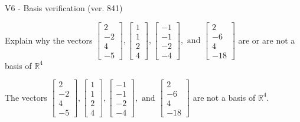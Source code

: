 \begin{exercise}
  \begin{exerciseTitle}V6 - Basis verification (ver. 841)\end{exerciseTitle}
  \begin{exerciseStatement}
    Explain why the vectors \(\left[\begin{array}{r}
2 \\
-2 \\
4 \\
-5
\end{array}\right] , \left[\begin{array}{r}
1 \\
1 \\
2 \\
4
\end{array}\right] , \left[\begin{array}{r}
-1 \\
-1 \\
-2 \\
-4
\end{array}\right] , \text{ and } \left[\begin{array}{r}
2 \\
-6 \\
4 \\
-18
\end{array}\right]\) are or are not a basis of \(\mathbb{R}^4\)	


  \end{exerciseStatement}
  \begin{exerciseAnswer}
   The vectors \(\left[\begin{array}{r}
2 \\
-2 \\
4 \\
-5
\end{array}\right] , \left[\begin{array}{r}
1 \\
1 \\
2 \\
4
\end{array}\right] , \left[\begin{array}{r}
-1 \\
-1 \\
-2 \\
-4
\end{array}\right] , \text{ and } \left[\begin{array}{r}
2 \\
-6 \\
4 \\
-18
\end{array}\right]\) 
  	 are not  a basis of \(\mathbb{R}^4\).
  


  \end{exerciseAnswer}
\end{exercise}